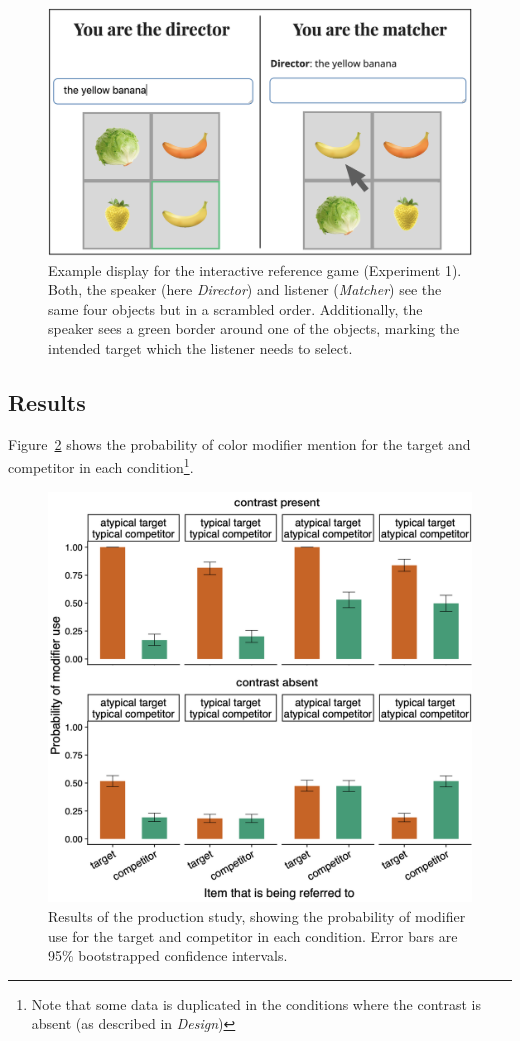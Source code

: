 \documentclass[10pt,letterpaper]{article}
\newcommand{\ek}[1]{\textcolor{Orange}{[ek: #1]}}
\begin{document}
\begin{figure}
	\begin{center}
		\includegraphics[width=.475\textwidth]{graphs/prod-design.pdf}
	\end{center}
\caption{Example display for the interactive reference game (Experiment 1). Both, the speaker (here \textit{Director}) and listener (\textit{Matcher}) see the same four objects but in a scrambled order. Additionally, the speaker sees a green border around one of the objects, marking the intended target which the listener needs to select.} 
\label{prod-design}
\end{figure}


\subsection{Results}
Figure~\ref{prod-results} shows the probability of color modifier mention for the target and competitor in each condition\footnote{Note that some data is duplicated in the conditions where the contrast is absent (as described in \textit{Design})}. 

\begin{figure}
	\begin{center}
		\includegraphics[width=.45\textwidth]{graphs/prod-bycond-paper.pdf}
	\end{center}
\caption{Results of the production study, showing the probability of modifier use for the target and competitor in each condition. Error bars are 95\% bootstrapped confidence intervals.} 
\label{prod-results}
\end{figure}
\end{document}
